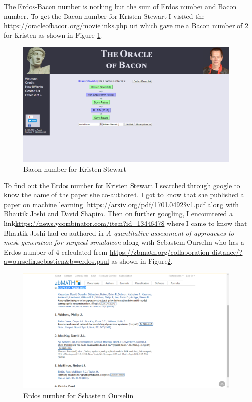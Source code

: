 \documentclass[letterpaper,11pt]{article}
\begin{document}
The Erdos-Bacon number is nothing but the sum of Erdos number and Bacon number.
To get the Bacon number for Kristen Stewart I visited the \url{https://oracleofbacon.org/movielinks.php} uri which gave me a Bacon number of 2 for Kristen as shown in Figure \ref{fig:q6bacon}.


\begin{figure}[h]
\centering
\includegraphics[scale=0.3]{bacon.png}
\caption{Bacon number for Kristen Stewart}
\label{fig:q6bacon}
\end{figure}



To find out the Erdos number for Kristen Stewart I searched through google to know the name of the paper she co-authored. I got to know that she published a paper on machine learning: \url{https://arxiv.org/pdf/1701.04928v1.pdf} along with Bhautik Joshi and David Shapiro. Then on further googling, I encountered a link\url{https://news.ycombinator.com/item?id=13446478} where I came to know that Bhautik Joshi had co-authored in \emph{A quantitative assessment of approaches to mesh generation for surgical simulation} along with Sebastein Ourselin who has a Erdos number of 4 calculated from \url{https://zbmath.org/collaboration-distance/?a=ourselin.sebastien&b=erdos.paul} as shown in Figure\ref{fig:q6erdos}. 

\clearpage

\begin{figure}[h]
\centering
\includegraphics[scale=0.3]{erdos.png}
\caption{Erdos number for Sebastein Ourselin}
\label{fig:q6erdos}
\end{figure}
\end{document}
